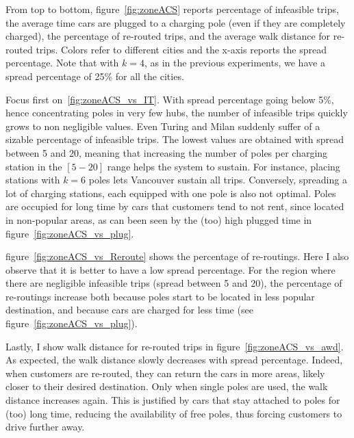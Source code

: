 From top to bottom, figure~\ref{fig:zoneACS} reports percentage of infeasible trips, the average time cars are plugged to a charging pole (even if they are completely charged), the percentage of re-routed trips,  and the average walk distance for re-routed trips. 
Colors refer to different cities and the x-axis reports the spread percentage. 
Note that with $k=4$, as in the previous experiments, we have a spread percentage of 25\% for all the cities.


Focus first on~\ref{fig:zoneACS_vs_IT}. With spread percentage going below 5\%, hence concentrating poles in very few hubs, the number of infeasible trips quickly grows to non negligible values. Even Turing and Milan suddenly suffer of a sizable percentage of infeasible trips.
The lowest values are obtained with spread between 5 and 20, meaning that increasing the number of poles per charging station in the $[5-20]$ range helps the system to sustain.
For instance, placing stations with $k=6$ poles lets Vancouver sustain all trips. 
Conversely, spreading a lot of charging stations, each equipped with one pole is also not optimal. Poles are occupied for long time by cars that customers tend to not rent, since located in non-popular areas, as can been seen by the (too) high plugged time in figure~\ref{fig:zoneACS_vs_plug}.


figure~\ref{fig:zoneACS_vs_Reroute} shows the percentage of re-routings. Here I also observe that it is better to have a low spread percentage.
For the region where there are negligible infeasible trips (spread between 5 and 20), the percentage of re-routings increase both because poles start to be located in less popular destination, and because cars are charged for less time (see figure~\ref{fig:zoneACS_vs_plug}).

Lastly, I show walk distance for re-routed trips in figure~\ref{fig:zoneACS_vs_awd}. As expected, the walk distance slowly decreases with spread percentage. Indeed, when customers are re-routed, they can return the cars in more areas, likely closer to their desired destination. Only when single poles are used, the walk distance increases again. This is justified by cars that stay attached to poles for (too) long time, reducing the availability of free poles, thus forcing customers to drive further away.

